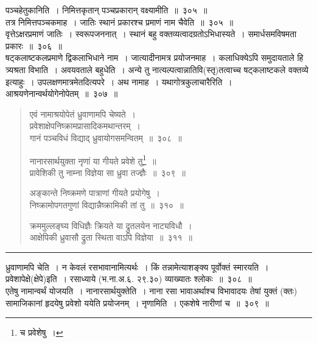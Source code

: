 \documentclass[11pt, openany]{book}
\begin{document}
{\qtt पञ्चहेतुकानिति}~। निमित्तकृतान् पञ्चप्रकारान् वक्ष्यामीति~॥~३०५~॥\\

तत्र निमित्तपञ्चकमाह~। {\qtt जातिः स्थानं प्रकारश्च प्रमाणं नाम चैवेति}~॥~३०५~॥\\

वृत्तेऽ{\qtt क्षरप्रमाणं जातिः}~। स्वरूपजननात्~। {\qtt स्थानं} बहु वक्तव्यत्वादग्रतोऽभिधास्यते~। {\qtt समार्धसमविषमता प्रकारः}~॥~३०६~॥\\

{\qtt षट्कलाष्टकलप्रमाणे द्विकला}भिधाने नाम~। जात्यादीनामत्र प्रयोजनमाह~। कलाधिक्येऽपि समुदायताले हि त्र्यश्रता विभाति~। अवयवताले बहुधेति~। {\qtt अन्ये} तु नात्यल्पत्वान्नातिवि(स्तृ)तत्वाच्च {\qtt षट्कलाष्टकले} वक्तव्ये इत्याहुः~। उपलक्षणमात्रमेतदित्यपरे~। अथ नामाह~। {\qtt यथागोत्रकुलाचारैरिति}~। आश्रयणेनान्वर्थयोगेनोपेतम्~॥~३०७~॥

\newpage

\begin{quote}
{\qt एवं नामाश्रयोपेतं ध्रुवाणामपि चेष्यते~।\\
 प्रवेशाक्षेपनिष्क्रामप्रासादिकमथान्तरम्~।\\
 गानं पञ्चविधं विद्याद् ध्रुवायोगसमन्वितम्~॥~३०८~॥

 नानारसार्थयुक्ता नृणां या गीयते प्रवेशे तु\renewcommand{\thefootnote}{1}\footnote{च प्रवेशेषु~।}~॥\\
 प्रावेशिकी तु नाम्ना विज्ञेया सा ध्रुवा तज्ज्ञैः~॥~३०९~॥

 अङ्कान्ते निष्क्रमणे पात्राणां गीयते प्रयोगेषु~। \\
 निष्क्रामोपगतगुणां विद्यान्नैष्क्रामिकी तां तु~॥~३१०~॥

 क्रममुल्लङ्घ्य विधिज्ञैः क्रियते या द्रुतलयेन नाट्यविधौ~।\\
 आक्षेपिकी ध्रुवासौ द्रुता स्थिता वाऽपि विज्ञेया~॥~३११~॥}
\end{quote}
 
\hrule

\vspace{2mm}
{\qtt ध्रुवाणामपि} चेति~। न केवलं रसभावानामित्यर्थः~। किं तन्नामेत्याशङ्क्य पूर्वोक्तं स्मारयति~। {\qtt प्रवेशापेक्षे}(क्षेपे)इति~। रसाध्याये (भ.ना.अ.६. २९.३०) व्याख्यातः श्लोकः~॥~३०८~॥\\

एतेषु नामान्वर्थं योजयति~। {\qtt नानारसार्थयुक्तेति~। नाना रसा भावा}अर्थाश्च विभावादयः तेषां युक्तं (क्तः) सामाजिकानां हृदयेषु प्रवेशो ययेति प्रयोजनम्~। नृणामिति~। एकशेषे नारीणां च~॥~३०९~॥\\
\end{document}
